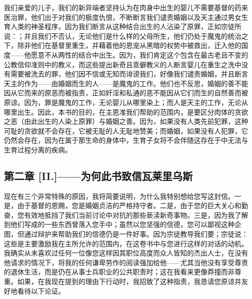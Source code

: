我们亲爱的儿子，我们的新异端者坚持认为在肉身中出生的婴儿不需要基督的药来医治罪，他们出于对我们的极度仇恨，不断断言我们谴责婚姻以及天主通过男女生育人类的神圣程序，因为我们断言从这种结合出生的人沾染了原罪，正如宗徒所说：；并且我们不否认，无论他们是什么样的父母所生，他们仍处于魔鬼的统治之下，除非他们在基督里重生，并藉着他的恩宠从黑暗的权势中被救出，迁入他的国度——他愿意不从两性的结合中出生。因为，我们肯定这个包含在最古老且不变的公教信仰准则中的教义，而这些提出新奇且乖僻教义的人断言婴儿在重生之洗中没有需要被洗去的罪，他们因不信或无知而诽谤我们，好像我们谴责婚姻，并且断言天主的作为——由婚姻而生的人——是魔鬼的工作。他们也不反思，婚姻的善不能因从它而来的原恶而被指责，正如奸淫和私通的恶不能因从它们而生的自然善而被原谅。因为，罪是魔鬼的工作，无论婴儿从哪里染上；而人是天主的工作，无论从哪里出生。因此，本书的目的，在主恩准我们帮助的范围内，是要区分肉体的贪欲之恶（由此出生的人染上原罪）与婚姻之善。因为，如果没有人类先前犯罪，这种可耻的贪欲就不会存在，它被无耻的人无耻地赞美；而婚姻，如果没有人犯罪，它仍然会存在，因为在属于那生命的身体中，生育子女将不会伴随这存在于中无法与生育过程分离的疾病。\par


\subsection{第二章 [II.]——为何此书致信瓦莱里乌斯}

现在有三个非常特殊的原因，我将简要说明，为什么我特别想给您写这封信。一是，由于基督的恩赐，您是婚姻贞洁的严格持守者。二是，由于您的巨大关心和勤奋，您有效地抵挡了我们当前讨论中对抗的那些亵渎新奇事物。三是，因为我了解到他们写成的一些东西曾落入您手中；虽然以您坚强的信德，您可以鄙视这种企图，但通过辩护来帮助我们的信德仍是一件好事。因为宗徒教导我们要；宗徒说：这些是主要激励我在主所允许的范围内，在这卷书中与您进行这样的对话的动机。我确实从未喜欢过任何一位像您这样因其职位高度而众人皆知的杰出人士，在没有他请求的情况下，将我的任何谦卑劳作的阅读强加给他——尤其当他没有享受尊贵的退休生活，而是仍在从事士兵职业的公共职责时；这在我看来更像莽撞而非尊重。如果，在我现在提到的理由下行动时，我招致了这种指责，我恳请您原谅并友好地看待以下论证。\par


